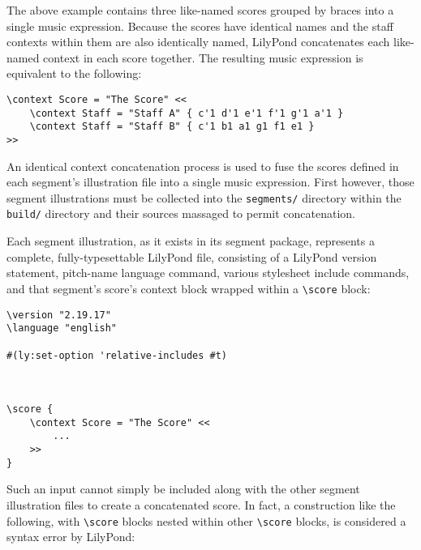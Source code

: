 \noindent The above example contains three like-named scores grouped by braces
into a single music expression. Because the scores have identical names and the
staff contexts within them are also identically named, LilyPond concatenates
each like-named context in each score together. The resulting music expression
is equivalent to the following:

\begin{singlespacing}
\vspace{-0.5\baselineskip}
\begin{verbatim}
\context Score = "The Score" <<
    \context Staff = "Staff A" { c'1 d'1 e'1 f'1 g'1 a'1 }
    \context Staff = "Staff B" { c'1 b1 a1 g1 f1 e1 }
>>
\end{verbatim}
\end{singlespacing}

\noindent An identical context concatenation process is used to fuse the scores
defined in each segment's illustration file into a single music expression.
First however, those segment illustrations must be collected into the
\texttt{segments/} directory within the \texttt{build/} directory and their
sources massaged to permit concatenation.

Each segment illustration, as it exists in its segment package, represents a
complete, fully-typesettable LilyPond file, consisting of a LilyPond version
statement, pitch-name language command, various stylesheet include commands,
and that segment's score's context block wrapped within a
\texttt{\textbackslash{}score} block:

\begin{singlespacing}
\vspace{-0.5\baselineskip}
\begin{verbatim}
\version "2.19.17"
\language "english"

#(ly:set-option 'relative-includes #t)



\score {
    \context Score = "The Score" <<
        ...
    >>
}
\end{verbatim}
\end{singlespacing}

\noindent Such an input cannot simply be included along with the other segment
illustration files to create a concatenated score. In fact, a construction like
the following, with \texttt{\textbackslash{}score} blocks nested within other
\texttt{\textbackslash{}score} blocks, is considered a syntax error by
LilyPond:

